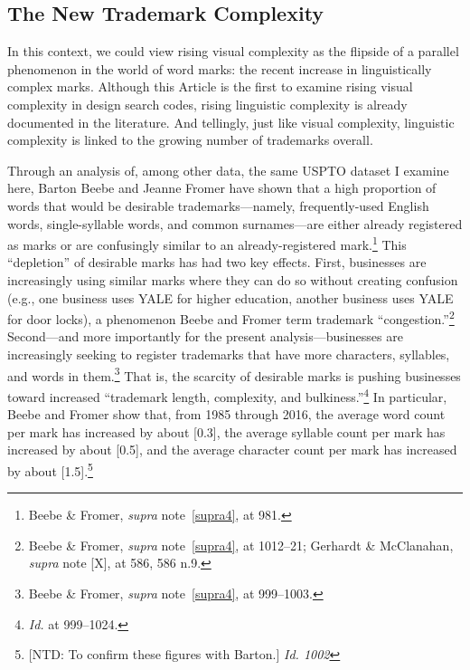 \documentclass[letterpaper, 11pt, oneside]{article}
\begin{document}
\subsection{The New Trademark Complexity}\label{subsec:2C}

In this context, we could view rising visual complexity as the flipside of a parallel phenomenon in the world of word marks: the recent increase in linguistically complex marks. Although this Article is the first to examine rising visual complexity in design search codes, rising linguistic complexity is already documented in the literature. And tellingly, just like visual complexity, linguistic complexity is linked to the growing number of trademarks overall.

Through an analysis of, among other data, the same USPTO dataset I examine here, Barton Beebe and Jeanne Fromer have shown that a high proportion of words that would be desirable trademarks—namely, frequently-used English words, single-syllable words, and common surnames—are either already registered as marks or are confusingly similar to an already-registered mark.\footnote{Beebe \& Fromer, \textit{supra} note~\ref{supra4}, at 981.} This ``depletion'' of desirable marks has had two key effects. First, businesses are increasingly using similar marks where they can do so without creating confusion (e.g., one business uses YALE for higher education, another business uses YALE for door locks), a phenomenon Beebe and Fromer term trademark ``congestion.''\footnote{Beebe \& Fromer, \textit{supra} note~\ref{supra4}, at 1012–21; Gerhardt \& McClanahan, \textit{supra} note [X], at 586, 586 n.9.} Second—and more importantly for the present analysis—businesses are increasingly seeking to register trademarks that have more characters, syllables, and words in them.\footnote{Beebe \& Fromer, \textit{supra} note~\ref{supra4}, at 999–1003.} That is, the scarcity of desirable marks is pushing businesses toward increased ``trademark length, complexity, and bulkiness.''\footnote{\textit{Id.} at 999–1024.}  In particular, Beebe and Fromer show that, from 1985 through 2016, the average word count per mark has increased by about [0.3], the average syllable count per mark has increased by about [0.5], and the average character count per mark has increased by about [1.5].\footnote{[NTD: To confirm these figures with Barton.] \textit{Id. 1002}}
\end{document}
